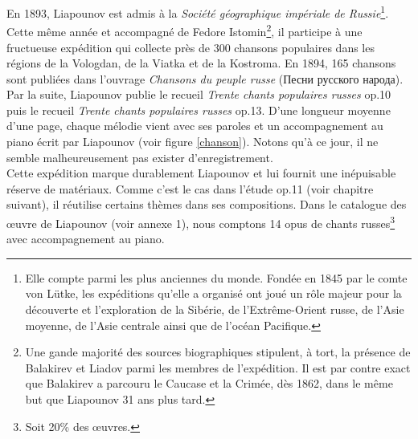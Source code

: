 En 1893, Liapounov est admis à la \emph{Société géographique impériale de Russie}\footnote{Elle compte parmi les plus anciennes du monde. Fondée en 1845 par le comte von Lütke, les expéditions qu'elle a organisé ont joué un rôle majeur pour la découverte et l'exploration de la Sibérie, de l'Extrême-Orient russe, de l'Asie moyenne, de l'Asie centrale ainsi que de l'océan Pacifique.}. Cette même année et accompagné de Fedore Istomin\footnote{Une gande majorité des sources biographiques stipulent, à tort, la présence de Balakirev et Liadov parmi les membres de l'expédition. Il est par contre exact que Balakirev a parcouru le Caucase et la Crimée, dès 1862, dans le même but que Liapounov 31 ans plus tard.}, il participe à une fructueuse expédition qui collecte près de 300 chansons populaires dans les régions de la Vologdan, de la Viatka et de la Kostroma. En 1894, 165 chansons sont publiées dans l'ouvrage \emph{Chansons du peuple russe} (\foreignlanguage{russian}{Песни русского народа}). Par la suite, Liapounov publie le recueil \emph{Trente chants populaires russes} op.10 puis le recueil \emph{Trente chants populaires russes} op.13. D'une longueur moyenne d'une page, chaque mélodie vient avec ses paroles et un accompagnement au piano écrit par Liapounov (voir figure \ref{chanson}). Notons qu'à ce jour, il ne semble malheureusement pas exister d'enregistrement.\\

Cette expédition marque durablement Liapounov et lui fournit une inépuisable réserve de matériaux. Comme c'est le cas dans l'étude op.11  (voir chapitre suivant), il réutilise certains thèmes dans ses compositions. Dans le catalogue des œuvre de Liapounov (voir annexe 1), nous comptons 14 opus de chants russes\footnote{Soit 20\% des œuvres.} avec accompagnement au piano.

